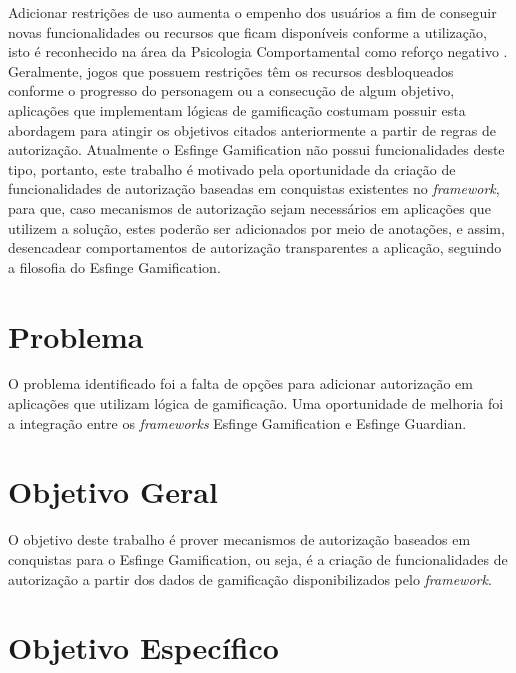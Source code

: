 \par Adicionar restrições de uso aumenta o empenho dos usuários a fim de conseguir novas funcionalidades ou recursos que ficam disponíveis conforme a utilização, isto é reconhecido na área da Psicologia Comportamental como reforço negativo  \cite{skinner1990behavior}. Geralmente, jogos que possuem restrições têm os recursos desbloqueados conforme o progresso do personagem ou a consecução de algum objetivo, aplicações que implementam lógicas de gamificação costumam possuir esta abordagem para atingir os objetivos citados anteriormente a partir de regras de autorização. Atualmente o Esfinge Gamification não possui funcionalidades deste tipo, portanto, este trabalho é motivado pela oportunidade da criação de funcionalidades de autorização baseadas em conquistas existentes no \textit{framework}, para que, caso mecanismos de autorização sejam necessários em aplicações que utilizem a solução, estes poderão ser adicionados por meio de anotações, e assim, desencadear comportamentos de autorização transparentes a aplicação, seguindo a filosofia do Esfinge Gamification.

\section{Problema}

\par O problema identificado foi a falta de opções para adicionar autorização em aplicações que utilizam lógica de gamificação. Uma oportunidade de melhoria foi a integração entre os \textit{frameworks} Esfinge Gamification e Esfinge Guardian.

\section{Objetivo Geral}
\par O objetivo deste trabalho é prover mecanismos de autorização baseados em conquistas para o Esfinge Gamification, ou seja, é a criação de funcionalidades de autorização a partir dos dados de gamificação disponibilizados pelo \textit{framework}.

\section{Objetivo Espec\'ifico}

